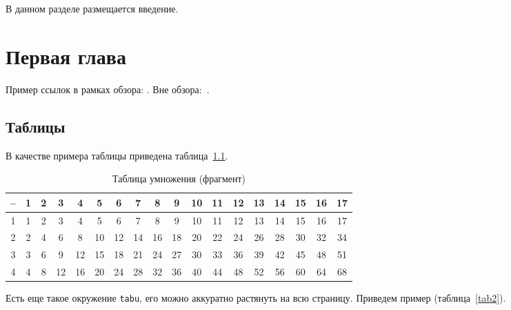 \documentclass[specification,annotation,times]{itmo-student-thesis}
\begin{document}

\tableofcontents

\startprefacepage

В данном разделе размещается введение.

\chapter{Первая глава}

\startrelatedwork
Пример ссылок в рамках обзора: \cite{example-english, example-russian, unrestricted-jump-evco, nsga-ii-steady-state}.
\finishrelatedwork
Вне обзора:~\cite{bellman}.

\section{Таблицы}\label{sec:tables}

В качестве примера таблицы приведена таблица~\ref{tab1}.

\begin{table}[!h]
\caption{Таблица умножения (фрагмент)}\label{tab1}
\centering
\begin{tabular}{|*{18}{c|}}\hline
-- & 1 & 2 & 3 & 4 & 5 & 6 & 7 & 8 & 9 & 10 & 11 & 12 & 13 & 14 & 15 & 16 & 17 \\\hline
1  & 1 & 2 & 3 & 4 & 5 & 6 & 7 & 8 & 9 & 10 & 11 & 12 & 13 & 14 & 15 & 16 & 17 \\\hline
2  & 2 & 4 & 6 & 8 & 10 & 12 & 14 & 16 & 18 & 20 & 22 & 24 & 26 & 28 & 30 & 32 & 34 \\\hline
3  & 3 & 6 & 9 & 12 & 15 & 18 & 21 & 24 & 27 & 30 & 33 & 36 & 39 & 42 & 45 & 48 & 51 \\\hline
4  & 4 & 8 & 12 & 16 & 20 & 24 & 28 & 32 & 36 & 40 & 44 & 48 & 52 & 56 & 60 & 64 & 68 \\\hline
\end{tabular}
\end{table}

Есть еще такое окружение \texttt{tabu}, его можно аккуратно растянуть на всю страницу.
Приведем пример (таблица~\ref{tab2}).
\end{document}
